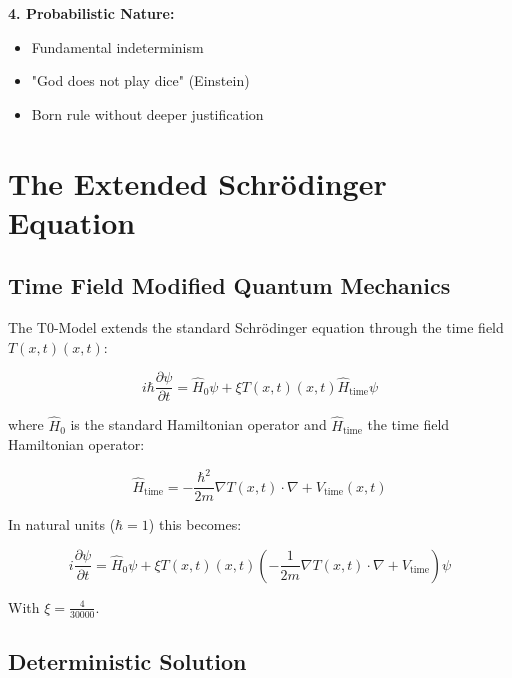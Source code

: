 \documentclass[12pt,a4paper]{report}
\newcommand{\Tfield}{T(x,t)}  %
\newcommand{\xipar}{\xi}      %
\begin{document}
	\textbf{4. Probabilistic Nature:}
	\begin{itemize}
		\item Fundamental indeterminism
		\item "God does not play dice" (Einstein)
		\item Born rule without deeper justification
	\end{itemize}
	
	\section{The Extended Schrödinger Equation}\label{sec:extended_schrodinger}
	
	\subsection{Time Field Modified Quantum Mechanics}\label{subsec:timefield_modified_qm}
	
	The T0-Model extends the standard Schrödinger equation through the time field $\Tfield(x,t)$:
	
	\begin{equation}\label{eq:extended_schrodinger}
		i\hbar \frac{\partial \psi}{\partial t} = \hat{H}_0 \psi + \xipar \Tfield(x,t) \hat{H}_{\text{time}} \psi
	\end{equation}
	
	where $\hat{H}_0$ is the standard Hamiltonian operator and $\hat{H}_{\text{time}}$ the time field Hamiltonian operator:
	
	\begin{equation}\label{eq:timefield_hamilton}
		\hat{H}_{\text{time}} = -\frac{\hbar^2}{2m} \nabla \Tfield \cdot \nabla + V_{\text{time}}(x,t)
	\end{equation}
	
	In natural units ($\hbar = 1$) this becomes:
	
	\begin{equation}\label{eq:extended_schrodinger_nat}
		i \frac{\partial \psi}{\partial t} = \hat{H}_0 \psi + \xipar \Tfield(x,t) \left(-\frac{1}{2m} \nabla \Tfield \cdot \nabla + V_{\text{time}}\right) \psi
	\end{equation}
	
	With $\xipar = \frac{4}{30000}$.
	
	\subsection{Deterministic Solution}\label{subsec:deterministic_solution}
	
\end{document}
